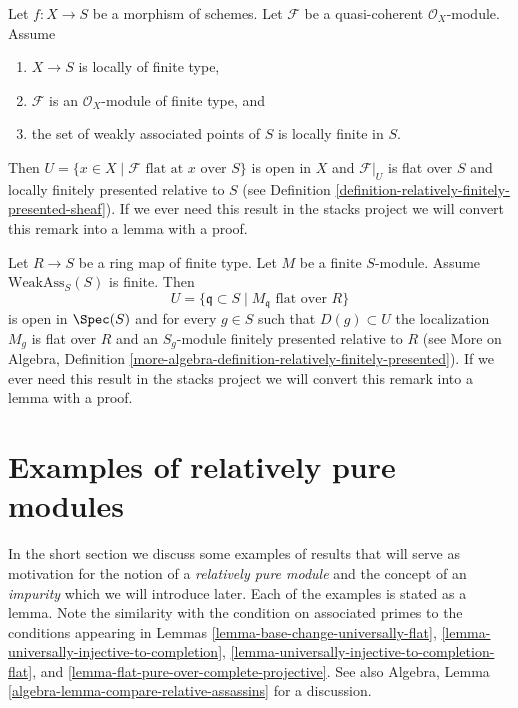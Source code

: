 \begin{remark}
\label{remark-finite-type-flat}
Let $f : X \to S$ be a morphism of schemes.
Let $\mathcal{F}$ be a quasi-coherent $\mathcal{O}_X$-module.
Assume
\begin{enumerate}
\item $X \to S$ is locally of finite type,
\item $\mathcal{F}$ is an $\mathcal{O}_X$-module of finite type, and
\item the set of weakly associated points of $S$ is locally finite in $S$.
\end{enumerate}
Then $U = \{x \in X \mid \mathcal{F}\text{ flat at }x\text{ over }S\}$
is open in $X$ and $\mathcal{F}|_U$ is flat over $S$ and locally
finitely presented relative to $S$ (see
Definition \ref{definition-relatively-finitely-presented-sheaf}).
If we ever need this result in the stacks project we will convert
this remark into a lemma with a proof.
\end{remark}

\begin{remark}
\label{remark-finite-type-flat-algebra}
Let $R \to S$ be a ring map of finite type.
Let $M$ be a finite $S$-module.
Assume $\text{WeakAss}_S(S)$ is finite.
Then
$$
U = \{\mathfrak q \subset S \mid M_{\mathfrak q}\text{ flat over }R\}
$$
is open in $\Spec(S)$ and for every $g \in S$ such that
$D(g) \subset U$ the localization $M_g$ is flat over $R$ and
an $S_g$-module finitely presented relative to $R$ (see
More on Algebra, Definition
\ref{more-algebra-definition-relatively-finitely-presented}).
If we ever need this result in the stacks project we will convert
this remark into a lemma with a proof.
\end{remark}









\section{Examples of relatively pure modules}
\label{section-examples-pure-modules}

\noindent
In the short section we discuss some examples of results that will serve
as motivation for the notion of a {\it relatively pure module} and the
concept of an {\it impurity} which we will introduce later. Each of the
examples is stated as a lemma. Note the similarity with the condition on
associated primes to the conditions appearing in
Lemmas \ref{lemma-base-change-universally-flat},
\ref{lemma-universally-injective-to-completion},
\ref{lemma-universally-injective-to-completion-flat}, and
\ref{lemma-flat-pure-over-complete-projective}.
See also
Algebra, Lemma \ref{algebra-lemma-compare-relative-assassins}
for a discussion.


